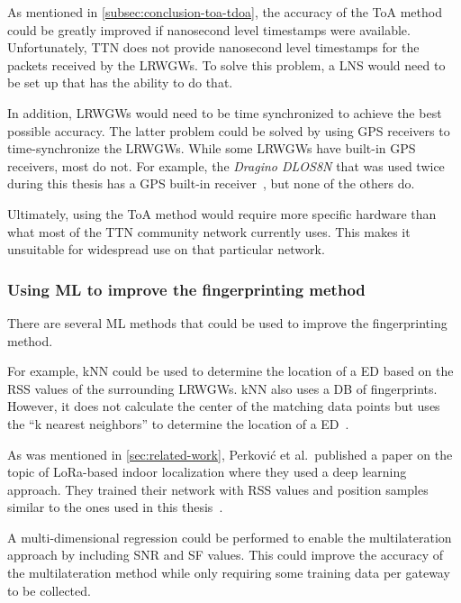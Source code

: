 As mentioned in \cref{subsec:conclusion-toa-tdoa}, the accuracy of the \ac{ToA} method could be greatly improved if nanosecond level timestamps were available.
Unfortunately, \ac{TTN} does not provide nanosecond level timestamps for the packets received by the \aclp{LRWGW}.
To solve this problem, a \ac{LNS} would need to be set up that has the ability to do that.

In addition, \aclp{LRWGW} would need to be time synchronized to achieve the best possible accuracy.
The latter problem could be solved by using \ac{GPS} receivers to time-synchronize the \aclp{LRWGW}.
While some \aclp{LRWGW} have built-in \ac{GPS} receivers, most do not.
For example, the \emph{Dragino DLOS8N} that was used twice during this thesis has a \ac{GPS} built-in receiver~\cite{dragino_technology_co_ltd_dlos8n_2023}, but none of the others do.

Ultimately, using the \ac{ToA} method would require more specific hardware than what most of the \ac{TTN} community network currently uses.
This makes it unsuitable for widespread use on that particular network.

\subsubsection{Using \acl{ML} to improve the fingerprinting method}

There are several \ac{ML} methods that could be used to improve the fingerprinting method.

For example, \ac{kNN} could be used to determine the location of a \acl{ED} based on the \ac{RSS} values of the surrounding \aclp{LRWGW}.
\ac{kNN} also uses a \ac{DB} of fingerprints.
However, it does not calculate the center of the matching data points but uses the ``k nearest neighbors'' to determine the location of a \acl{ED}~\cite{anagnostopoulos_reproducible_2019}.

As was mentioned in \cref{sec:related-work}, Perković et al.\ published a paper on the topic of \ac{LoRa}-based indoor localization where they used a deep learning approach.
They trained their network with \ac{RSS} values and position samples similar to the ones used in this thesis~\cite{perkovic_machine_2023}.

A multi-dimensional regression could be performed to enable the multilateration approach by including \ac{SNR} and \ac{SF} values.
This could improve the accuracy of the multilateration method while only requiring some training data per gateway to be collected.

